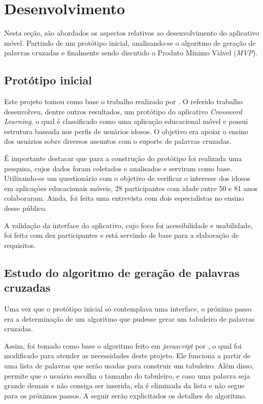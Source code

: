 \section{Desenvolvimento}
Nesta seção, são abordados os aspectos relativos ao desenvolvimento do aplicativo móvel. Partindo de um protótipo inicial, analisando-se o algoritmo de geração de palavras cruzadas e finalmente sendo discutido o Produto Mínimo Viável (\textit{MVP}).

\subsection{Protótipo inicial}

Este projeto tomou como base o trabalho realizado por \cite{oliveira2018crossword}. O referido trabalho desenvolveu, dentre outros resultados, um protótipo do aplicativo \textit{Crossword Learning}, o qual é classificado como uma aplicação educacional móvel e possui estrutura baseada nos perfis de usuários idosos. O objetivo era apoiar o ensino dos usuários sobre diversos assuntos com o suporte de palavras cruzadas.

É importante destacar que para a construção do protótipo foi realizada uma pesquisa, cujos dados foram coletados e analisados e serviram como base.
Utilizando-se um questionário com o objetivo de verificar o interesse dos idosos em aplicações educacionais móveis, 28 participantes com idade entre 50 e 81 anos colaboraram. Ainda, foi feita uma entrevista com dois especialistas no ensino desse público.

A validação da interface do aplicativo, cujo foco foi acessibilidade e usabilidade, foi feita com dez participantes e está servindo de base para a elaboração de requisitos. 

\subsection{Estudo do algoritmo de geração de palavras cruzadas}
Uma vez que o protótipo inicial só contemplava uma interface, o próximo passo era a determinação de um algoritmo que pudesse gerar um tabuleiro de palavras cruzadas. 

Assim, foi tomado como base o algoritmo feito em \textit{javascript} por \cite{layoutGenerator}, o qual foi modificado para atender as necessidades deste projeto. Ele funciona a partir de uma lista de palavras que serão usadas para construir um tabuleiro. Além disso, permite que o usuário escolha o tamanho do tabuleiro, e caso uma palavra seja grande demais e não consiga ser inserida, ela é eliminada da lista e não segue para os próximos passos. A seguir serão explicitados os detalhes do algoritmo.

